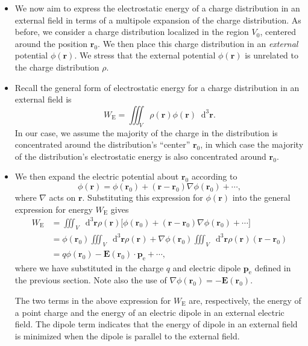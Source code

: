 \documentclass[11pt, a4paper]{article}
\newcommand{\diff}{\mathop{}\!\mathrm{d}} %
\newcommand{\dr}{\diff^{3} \r}  %
\renewcommand{\vec}[1]{\bm{#1}} %
\renewcommand{\r}{\vec{r}}
\newcommand{\E}{\vec{E}} %
\newcommand{\pe}{\vec{p}_{\text{e}}}  %
\renewcommand{\grad}{\nabla}
\begin{document}
\begin{itemize}
    \item We now aim to express the electrostatic energy of a charge distribution in an external field in terms of a multipole expansion of the charge distribution. As before, we consider a charge distribution localized in the region $ V_{0} $, centered around the position $ \r_{0} $. We then place this charge distribution in an \textit{external} potential $ \phi(\r) $. We stress that the external potential $ \phi(\r) $ is unrelated to the charge distribution $ \rho $.
	
	\item Recall the general form of electrostatic energy for a charge distribution in an external field is
	\begin{equation*}
		W_{\text{E}} = \iiint_{V} \rho(\r) \phi(\r) \dr.
	\end{equation*}
	In our case, we assume the majority of the charge in the distribution is concentrated around the distribution's ``center'' $ \r_{0} $, in which case the majority of the distribution's electrostatic energy is also concentrated around $ \r_{0} $. 
	
	\item We then expand the electric potential about $ \r_{0} $ according to
	\begin{equation*}
		\phi(\r) = \phi(\r_{0}) + (\r - \r_{0}) \grad \phi(\r_{0}) + \cdots,
	\end{equation*}
    where $ \grad $ acts on $ \r $. Substituting this expression for $ \phi(\r) $ into the general expression for energy $ W_{\text{E}} $ gives
	\begin{align*}
		W_{\text{E}} &= \iiint_{V}\dr \rho(\r)\big[\phi(\r_{0}) + (\r - \r_{0})\grad \phi(\r_{0}) + \cdots \big]\\
		& = \phi(\r_{0}) \iiint_{V} \dr \rho(\r) + \grad \phi(\r_{0}) \iiint_{V} \dr \rho(\r)(\r - \r_{0})\\
		& = q \phi(\r_{0}) - \E(\r_{0}) \cdot \pe + \cdots,
	\end{align*}
    where we have substituted in the charge $ q $ and electric dipole $ \pe $ defined in the previous section. Note also the use of $ \grad\phi(\r_{0}) = - \E(\r_{0}) $. 

    The two terms in the above expression for $ W_{\text{E}} $ are, respectively, the energy of a point charge and the energy of an electric dipole in an external electric field. The dipole term indicates that the energy of dipole in an external field is minimized when the dipole is parallel to the external field.
	
\end{itemize}
\end{document}
